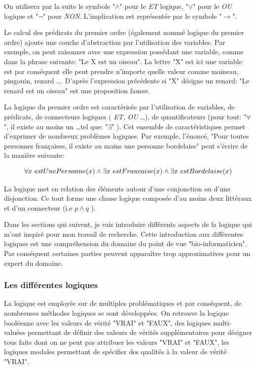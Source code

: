 \begin{refsegment}
    On utilisera par la suite le symbole "$\land$" pour le \textit{ET} logique, "$\lor$" pour le \textit{OU} logique et "$\lnot$" pour \textit{NON}. L'implication est représentée par le symbole "$\rightarrow$". 
    
    Le calcul des prédicats du premier ordre (également nommé logique du premier ordre) ajoute une couche d'abstraction par l'utilisation des variables. Par exemple, on peut raisonner avec une expression possédant une variable, comme dans la phrase suivante: "Le X est un oiseau". La lettre "X" est ici une variable est par conséquent elle peut prendre n'importe quelle valeur comme moineau, pingouin, renard \ldots. D'après l'expression précédente si "X" désigne un renard: "Le renard est un oiseau" est une proposition fausse.
    
    La logique du premier ordre est caractérisée par l'utilisation de variables, de prédicats, de connecteurs logiques ( \textit{ET}, \textit{OU} \ldots), de quantificateurs (pour tout: "$\forall$", il existe au moins un \ldots tel que: "$\exists$" ). Cet ensemble de caractéristiques permet d’exprimer de nombreux problèmes logiques. Par exemple, l'énoncé, "Pour toutes personnes françaises, il existe au moins une personne bordelaise" peut s'écrire de la manière suivante:\nolisttopbreak
    
    \begin{equation*}
        \forall x~estUnePersonne(x) \land \exists x~estFrancaise(x) \land \exists x~estBordelaise(x) \stepcounter{equation}
    \end{equation*}
    
    
    La logique met en relation des éléments autour d'une conjonction ou d'une disjonction. Ce tout forme une clause logique composée d'au moins deux littéraux et d'un connecteur (i.e $p \land q$ ).
    
    Dans les sections qui suivent, je vais introduire différents aspects de la logique qui m'ont inspiré pour mon travail de recherche. Cette introduction aux différentes logiques est une compréhension du domaine du point de vue "bio-informaticien". Par conséquent certaines parties peuvent apparaître trop approximatives pour un expert du domaine.
    
    \subsubsection{Les différentes logiques}
    
    La logique est employée sur de multiples problématiques et par conséquent, de nombreuses méthodes logiques se sont développées. On retrouve la logique booléenne avec les valeurs de vérité "VRAI" et "FAUX", des logiques multi-valuées permettant de définir des valeurs de vérités supplémentaires pour désigner tous faits dont on ne peut pas attribuer les valeurs  "VRAI" et "FAUX", les logiques modales permettant de spécifier des qualités à la valeur de vérité  "VRAI".
    

\end{refsegment}
